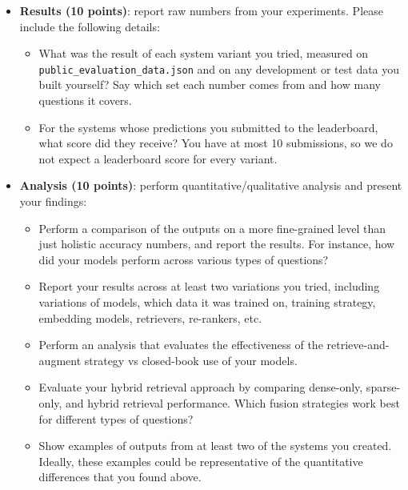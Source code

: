 \documentclass[11pt]{article}
\begin{document}
\begin{itemize}[leftmargin=2em]
\begin{itemize}[leftmargin=1.6em]
\begin{itemize}[nosep, leftmargin=1.4em]
        \end{itemize}
      \item \textbf{Results (10 points)}: report raw numbers from your experiments. Please include the
        following details:
        \begin{itemize}[nosep, leftmargin=1.4em]
          \item What was the result of each system variant you tried, measured on
            \texttt{public\_evaluation\_data.json} and on any development or test data you built
            yourself? Say which set each number comes from and how many questions it covers.
          \item For the systems whose predictions you submitted to the leaderboard, what score did
            they receive? You have at most 10 submissions, so we do not expect a leaderboard score
            for every variant.
        \end{itemize}
      \item \textbf{Analysis (10 points)}: perform quantitative/qualitative analysis and present your
        findings:
        \begin{itemize}[nosep, leftmargin=1.4em]
          \item Perform a comparison of the outputs on a more fine-grained level than just holistic
            accuracy numbers, and report the results. For instance, how did your models perform across
            various types of questions?
          \item Report your results across at least two variations you tried, including variations of
            models, which data it was trained on, training strategy, embedding models, retrievers,
            re-rankers, etc.
          \item Perform an analysis that evaluates the effectiveness of the retrieve-and-augment
            strategy vs closed-book use of your models.
          \item Evaluate your hybrid retrieval approach by comparing dense-only, sparse-only, and
            hybrid retrieval performance. Which fusion strategies work best for different types of
            questions?
          \item Show examples of outputs from at least two of the systems you created. Ideally, these
            examples could be representative of the quantitative differences that you found above.
        \end{itemize}
    \end{itemize}
\end{itemize}
\end{document}
